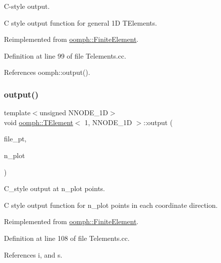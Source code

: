 C-\/style output. 

C style output function for general 1D T\+Elements. 

Reimplemented from \hyperlink{classoomph_1_1FiniteElement_a72cddd09f8ddbee1a20a1ff404c6943e}{oomph\+::\+Finite\+Element}.



Definition at line 99 of file Telements.\+cc.



References oomph\+::output().

\mbox{\label{classoomph_1_1TElement_3_011_00_01NNODE__1D_01_4_a5f114a354044d07c376087c081fa6b6f}} 
\subsubsection{\texorpdfstring{output()}{output()}\hspace{0.1cm}{\footnotesize\ttfamily [4/4]}}
{\footnotesize\ttfamily template$<$unsigned N\+N\+O\+D\+E\+\_\+1D$>$ \\
void \hyperlink{classoomph_1_1TElement}{oomph\+::\+T\+Element}$<$ 1, N\+N\+O\+D\+E\+\_\+1D $>$\+::output (\begin{DoxyParamCaption}\item[{F\+I\+LE $\ast$}]{file\+\_\+pt,  }\item[{const unsigned \&}]{n\+\_\+plot }\end{DoxyParamCaption})\hspace{0.3cm}{\ttfamily [virtual]}}



C\+\_\+style output at n\+\_\+plot points. 

C style output function for n\+\_\+plot points in each coordinate direction. 

Reimplemented from \hyperlink{classoomph_1_1FiniteElement_adfaee690bb0608f03320eeb9d110d48c}{oomph\+::\+Finite\+Element}.



Definition at line 108 of file Telements.\+cc.



References i, and s.

\mbox{\label{classoomph_1_1TElement_3_011_00_01NNODE__1D_01_4_a6e15175e55322aa0f83062dbae4542cd}} 
